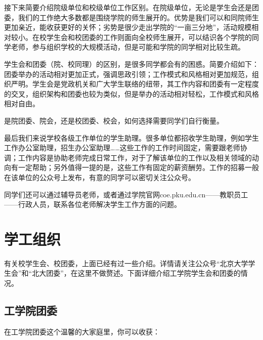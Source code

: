 \documentclass[11pt,oneside]{book}
\begin{document}
接下来简要介绍院级单位和校级单位工作区别。在院级单位，无论是学生会还是团委，我们的工作绝大多数都是围绕学院的师生展开的。优势是我们可以和同院师生更加亲近，能收获更好的关怀；劣势是很少走出学院的“一亩三分地”，活动规模相对较小。在校学生会和校团委的工作则面向全校师生展开，可以结识各个学院的同学老师，参与组织学校的大规模活动，但是可能和学院的同学相对比较生疏。

\vspace{10pt}

学生会和团委（院、校同理）的区别，是很多同学都会有的困惑。简要介绍如下：团委举办的活动相对更加正式，强调思政引领；工作模式和风格相对更加规范，组织严明。学生会是党政机关和广大学生联络的纽带，其工作内容和团委有一定程度的交叉，组织架构和团委也较为类似，但是举办的活动相对轻松，工作模式和风格相对自由。

\vspace{10pt}

是院团委、院会，还是校团委、校会，如何选择需要同学们自行衡量。

\vspace{10pt}

最后我们来说学校各级工作单位的学生助理。很多单位都招收学生助理，例如学生工作办公室助理，招生办公室助理……这些工作的工作时间固定，需要跟老师协调；工作内容是协助老师完成日常工作，对于了解该单位的工作以及相关领域的动向有一定帮助；另外值得一提的是，这些工作有固定的薪资酬劳。工作的招募一般在该单位的公众号上发布，有意的同学可以密切关注公众号。

\vspace{10pt}

同学们还可以通过辅导员老师，或者通过学院官网coe.pku.edu.cn——教职员工——行政人员，联系各位老师解决学生工作方面的问题。

\section{学工组织}

有关校学生会、校团委，上面已经有过一些介绍。详情请关注公众号“北京大学学生会”和“北大团委”，在这里不做赘述。下面详细介绍工学院学生会和团委的情况。

\vspace{10pt}

\subsection{工学院团委}

在工学院团委这个温馨的大家庭里，你可以收获：
\end{document}
